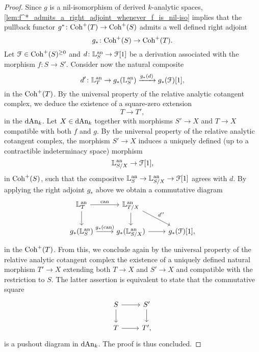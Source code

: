 \documentclass[10pt,a4paper,reqno]{amsart} %
\theoremstyle{plain}
\theoremstyle{definition}
\theoremstyle{remark}
\numberwithin{equation}{section}
\begin{document}
\begin{proof}
    Since $g$ is a nil-isomorphism of derived $k$-analytic spaces, \cref{lem:f^*_admits_a_right_adjoint_whenever_f_is_nil-iso}
    implies that the pullback functor $g^* \colon \mathrm{Coh}^+(T) \to \mathrm{Coh}^+(S)$ admits a well defined right adjoint
        \[
            g_* \colon \mathrm{Coh}^+(S ) \to \mathrm{Coh}^+(T) .
        \]
    Let $\mathcal F \in \mathrm{Coh}^+(S)^{\ge 0}$ and $d \colon \mathbb L^\mathrm{an}_S \to \mathcal F[1]$ be a derivation
    associated with the morphism $f \colon S \to S'$. Consider now the natural composite
        \[
            d ' \colon \mathbb L^\mathrm{an}_T \to g_* (\mathbb L^\mathrm{an}_S) \xrightarrow{g_*(d)} g_* (\mathcal F)[1],  
        \]
    in the \infcat $\mathrm{Coh}^+(T)$. By the universal property of the relative analytic cotangent complex, we deduce the existence of a square-zero extension
        \[
            T \to T',  
        \]
    in the \infcat $\mathrm{dAn}_k$. Let $X \in \mathrm{dAn}_k$ together with morphisms $S' \to X$ and $T \to X$ compatible with both $f$ and $g$. By the universal property of
    the relative analytic cotangent complex, the morphism $S' \to X$ induces a uniquely defined (up to a contractible indeterminacy space) morphism
        \[
            \mathbb L^\mathrm{an}_{S/X} \to \mathcal F[1],
        \]
    in $\mathrm{Coh}^+(S)$, such that the compositve $\mathbb L^\mathrm{an}_S \to \mathbb L^\mathrm{an}_{S/X} \to \mathcal F[1]$ agrees with $d$. By applying the right adjoint $g_*$ above we obtain a
    commutative diagram
        \[
        \begin{tikzcd}
            \bbL\an_T \ar{r}{\mathrm{can}} \ar{d} & \bbL\an_{T/X} \ar{d} \ar{rd}{d''} & \\
            g_*(\bbL\an_S) \ar{r}{g_*(\mathrm{can})} & g_*(\bbL\an_{S/X}) \ar{r} & g_*(\cF)[1],
        \end{tikzcd}
        \]
    in the \infcat $\mathrm{Coh}^+(T)$. From this, we conclude again by the universal property of the relative analytic cotangent complex the existence
    of a uniquely defined natural morphism $T' \to X$ extending both $T \to X$ and $S' \to X$ and compatible with the restriction to $S$. The latter assertion is equivalent to state
    that the commutative square
        \[
        \begin{tikzcd}
            S \ar{r} \ar{d} & S' \ar{d} \\
            T \ar{r} & T',
        \end{tikzcd}
        \]
    is a pushout diagram in $\mathrm{dAn}_k$. The proof is thus concluded.
\end{proof}
\end{document}
